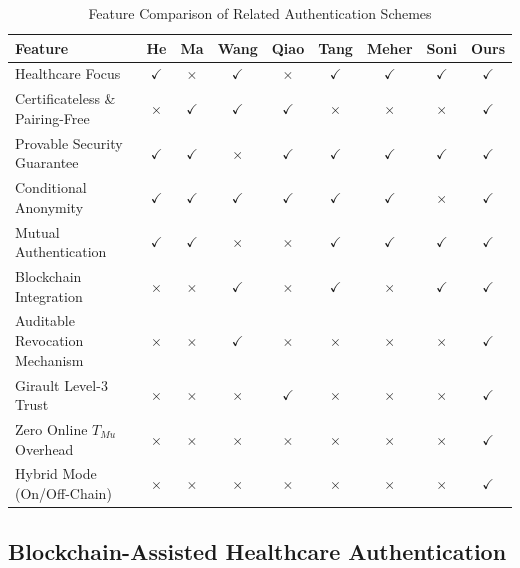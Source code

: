 \documentclass[conference]{IEEEtran}
\begin{document}
\begin{table}[htbp]
\centering
\caption{Feature Comparison of Related Authentication Schemes}
\label{tab:comparison}
\renewcommand{\arraystretch}{1.2}
\setlength{\tabcolsep}{4pt}
\begin{tabular}{|l|c|c|c|c|c|c|c|c|}
\hline
\textbf{Feature} & \textbf{He \cite{ref27}} & \textbf{Ma \cite{ref22}} & \textbf{Wang \cite{ref1}} & \textbf{Qiao \cite{ref24}} & \textbf{Tang \cite{ref25}} & \textbf{Meher \cite{ref28}} & \textbf{Soni \cite{ref26}} & \textbf{Ours} \\
\hline
Healthcare Focus & $\checkmark$ & $\times$ & $\checkmark$ & $\times$ & $\checkmark$ & $\checkmark$ & $\checkmark$ & $\checkmark$ \\
\hline
Certificateless \& Pairing-Free & $\times$ & $\checkmark$ & $\checkmark$ & $\checkmark$ & $\times$ & $\times$ & $\times$ & $\checkmark$ \\
\hline
Provable Security Guarantee & $\checkmark$ & $\checkmark$ & $\times$ & $\checkmark$ & $\checkmark$ & $\checkmark$ & $\checkmark$ & $\checkmark$ \\
\hline
Conditional Anonymity & $\checkmark$ & $\checkmark$ & $\checkmark$ & $\checkmark$ & $\checkmark$ & $\checkmark$ & $\times$ & $\checkmark$ \\
\hline
Mutual Authentication & $\checkmark$ & $\checkmark$ & $\times$ & $\times$ & $\checkmark$ & $\checkmark$ & $\checkmark$ & $\checkmark$ \\
\hline
Blockchain Integration & $\times$ & $\times$ & $\checkmark$ & $\times$ & $\checkmark$ & $\times$ & $\checkmark$ & $\checkmark$ \\
\hline
Auditable Revocation Mechanism & $\times$ & $\times$ & $\checkmark$ & $\times$ & $\times$ & $\times$ & $\times$ & $\checkmark$ \\
\hline
Girault Level-3 Trust & $\times$ & $\times$ & $\times$ & $\checkmark$ & $\times$ & $\times$ & $\times$ & $\checkmark$ \\
\hline
Zero Online $T_{Mu}$ Overhead & $\times$ & $\times$ & $\times$ & $\times$ & $\times$ & $\times$ & $\times$ & $\checkmark$ \\
\hline
Hybrid Mode (On/Off-Chain) & $\times$ & $\times$ & $\times$ & $\times$ & $\times$ & $\times$ & $\times$ & $\checkmark$ \\
\hline
\end{tabular}
\end{table}


\subsection{Blockchain-Assisted Healthcare Authentication}
\end{document}
